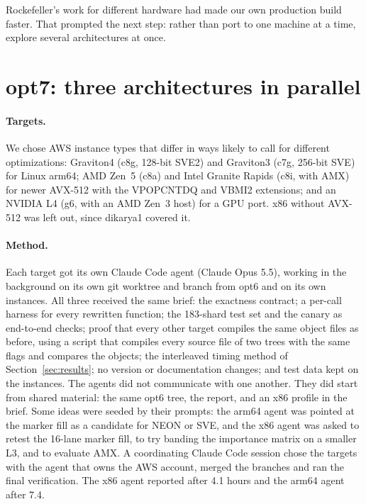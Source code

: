 \documentclass[11pt]{article}
\begin{document}
Rockefeller's work for different hardware had made our own production build faster. That
prompted the next step: rather than port to one machine at a time, explore several
architectures at once.

\section{opt7: three architectures in parallel}
\label{sec:opt7}

\paragraph{Targets.} We chose AWS instance types that differ in ways likely to call for
different optimizations: Graviton4 (c8g, 128-bit SVE2) and Graviton3 (c7g, 256-bit SVE) for
Linux arm64; AMD Zen~5 (c8a) and Intel Granite Rapids (c8i, with AMX) for newer AVX-512 with
the VPOPCNTDQ and VBMI2 extensions; and an NVIDIA L4 (g6, with an AMD Zen~3 host) for a GPU
port. x86 without AVX-512 was left out, since dikarya1 covered it.

\paragraph{Method.} Each target got its own Claude Code agent (Claude Opus 5.5), working in the
background on its own git worktree and branch from opt6 and on its own instances. All three
received the same brief: the exactness contract; a per-call harness for every rewritten
function; the 183-shard test set and the canary as end-to-end checks; proof that every other
target compiles the same object files as before, using a script that compiles every source
file of two trees with the same flags and compares the objects; the interleaved timing method
of Section~\ref{sec:results}; no version or documentation changes; and test data kept on the
instances. The agents did not communicate with one another. They did start from shared
material: the same opt6 tree, the report, and an x86 profile in the brief. Some ideas were
seeded by their prompts: the arm64 agent was pointed at the marker fill as a candidate for NEON
or SVE, and the x86 agent was asked to retest the 16-lane marker fill, to try banding the
importance matrix on a smaller L3, and to evaluate AMX. A coordinating Claude Code session
chose the targets with the agent that owns the AWS account, merged the branches and ran the
final verification. The x86 agent reported after 4.1 hours and the arm64 agent after 7.4.
\end{document}
